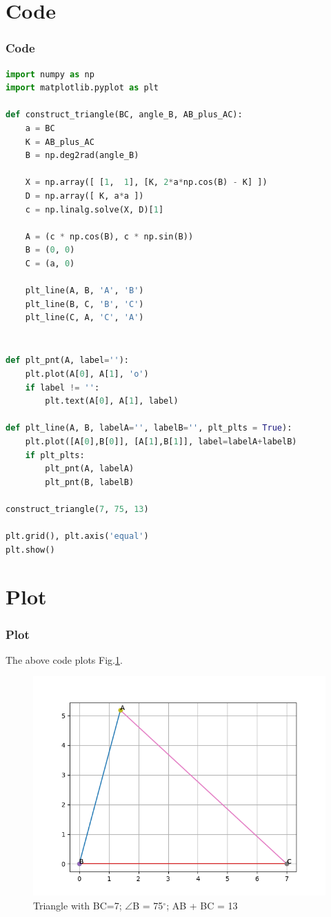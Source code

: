 \documentclass{beamer}
\theoremstyle{remark}
\numberwithin{equation}{section}
\begin{document}
\section{Code}
\begin{frame}[fragile]
\frametitle{Code}
{\footnotesize
\begin{lstlisting}[language=Python]
import numpy as np
import matplotlib.pyplot as plt
		
def construct_triangle(BC, angle_B, AB_plus_AC):
    a = BC
    K = AB_plus_AC
    B = np.deg2rad(angle_B)

    X = np.array([ [1,  1], [K, 2*a*np.cos(B) - K] ])
    D = np.array([ K, a*a ])
    c = np.linalg.solve(X, D)[1]

    A = (c * np.cos(B), c * np.sin(B))
    B = (0, 0)
    C = (a, 0)

    plt_line(A, B, 'A', 'B')
    plt_line(B, C, 'B', 'C')
    plt_line(C, A, 'C', 'A')
    
\end{lstlisting}
}
\end{frame}
\begin{frame}[fragile]
\frametitle{}
{\footnotesize
\begin{lstlisting}[language=Python]
def plt_pnt(A, label=''):
	plt.plot(A[0], A[1], 'o')
	if label != '':
		plt.text(A[0], A[1], label)
		
def plt_line(A, B, labelA='', labelB='', plt_plts = True):
	plt.plot([A[0],B[0]], [A[1],B[1]], label=labelA+labelB)
	if plt_plts:
		plt_pnt(A, labelA)
		plt_pnt(B, labelB)
		
construct_triangle(7, 75, 13)

plt.grid(), plt.axis('equal')
plt.show()
\end{lstlisting}
}
\end{frame}

\section{Plot}
\begin{frame}
\frametitle{Plot}
The above code plots Fig.\ref{fig:direction_vectors}.
\begin{figure}
\centering
\includegraphics[width=0.75\columnwidth]{Figure_1.png}
\caption{Triangle with BC=7; $\angle$B = 75$^{\circ}$; AB + BC = 13}
\label{fig:direction_vectors}
\end{figure}
\end{frame}
\end{document}
